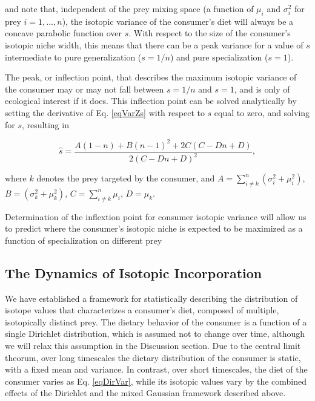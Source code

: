 \documentclass[11pt]{article}
\begin{document}
\noindent and note that, independent of the prey mixing space (a function of $\mu_i$ and $\sigma_i^2$ for prey $i=1,...,n$), the isotopic variance of the consumer's diet will always be a concave parabolic function over $s$.
With respect to the size of the consumer's isotopic niche width, this means that there can be a peak variance for a value of $s$ intermediate to pure generalization ($s=1/n$) and pure specialization ($s=1$).

The peak, or inflection point, that describes the maximum isotopic variance of the consumer may or may not fall between $s=1/n$ and $s=1$, and is only of ecological interest if it does.
This inflection point can be solved analytically by setting the derivative of Eq. \ref{eqVarZs} with respect to $s$ equal to zero, and solving for $s$, resulting in

\begin{equation}
	\hat s = \frac{A(1-n)+B (n-1)^2+2 C (C-D n+D)}{2 (C-D n+D)^2},
\end{equation}

\noindent where $k$ denotes the prey targeted by the consumer, and $A = \sum_{i \neq k}^n \left(\sigma_i^2 + \mu_i^2\right)$, $B = \left(\sigma_k^2 + \mu_k^2\right)$, $C = \sum_{i \neq k}^n \mu_i$, $D = \mu_k$.

Determination of the inflextion point for consumer isotopic variance will allow us to predict where the consumer's isotopic niche is expected to be maximized as a function of specialization on different prey




\subsection*{The Dynamics of Isotopic Incorporation}
We have established a framework for statistically describing the distribution of isotope values that characterizes a consumer's diet, composed of multiple, isotopically distinct prey.
The dietary behavior of the consumer is a function of a single Dirichlet distribution, which is assumed not to change over time, although we will relax this assumption in the Discussion section.
Due to the central limit theorum, over long timescales the dietary distribution of the consumer is static, with a fixed mean and variance.
In contrast, over short timescales, the diet of the consumer varies as Eq. \ref{eqDirVar}, while its isotopic values vary by the combined effects of the Dirichlet and the mixed Gaussian framework described above.
\end{document}

